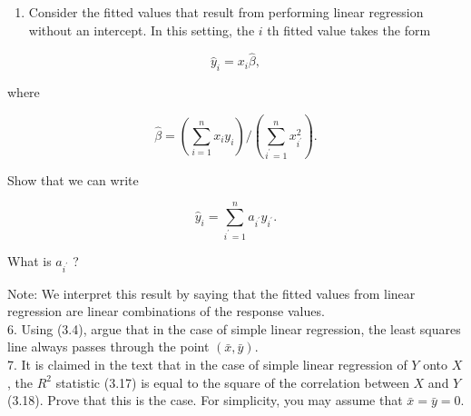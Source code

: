 \documentclass[10pt]{article}
\begin{document}
\begin{enumerate}
(b) Answer (a) using test rather than training RSS.\\
(c) Suppose that the true relationship between X and Y is not linear, but we don't know how far it is from linear. Consider the training RSS for the linear regression, and also the training RSS for the cubic regression. Would we expect one to be lower than the other, would we expect them to be the same, or is there not enough information to tell? Justify your answer.\\
(d) Answer (c) using test rather than training RSS.
  \item Consider the fitted values that result from performing linear regression without an intercept. In this setting, the $i$ th fitted value takes the form
\end{enumerate}

$$
\hat{y}_{i}=x_{i} \hat{\beta},
$$

where


\begin{equation*}
\hat{\beta}=\left(\sum_{i=1}^{n} x_{i} y_{i}\right) /\left(\sum_{i^{\prime}=1}^{n} x_{i^{\prime}}^{2}\right) . \tag{3.38}
\end{equation*}


Show that we can write

$$
\hat{y}_{i}=\sum_{i^{\prime}=1}^{n} a_{i^{\prime}} y_{i^{\prime}} .
$$

What is $a_{i^{\prime}}$ ?

Note: We interpret this result by saying that the fitted values from linear regression are linear combinations of the response values.\\
6. Using (3.4), argue that in the case of simple linear regression, the least squares line always passes through the point $(\bar{x}, \bar{y})$.\\
7. It is claimed in the text that in the case of simple linear regression of $Y$ onto $X$, the $R^{2}$ statistic (3.17) is equal to the square of the correlation between $X$ and $Y$ (3.18). Prove that this is the case. For simplicity, you may assume that $\bar{x}=\bar{y}=0$.
\end{document}
